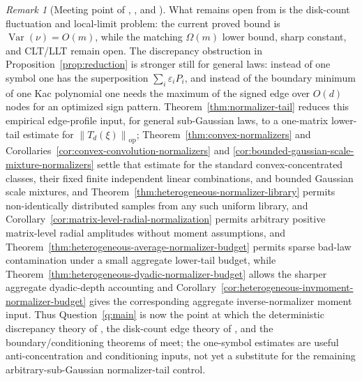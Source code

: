 \documentclass[11pt]{amsart}
\numberwithin{equation}{section}
\theoremstyle{definition}
\theoremstyle{remark}
\newtheorem{remark}[theorem]{Remark}
\newcommand{\op}{\mathrm{op}}
\newcommand{\norm}[1]{\left\lVert #1\right\rVert}
\newcommand{\eps}{\varepsilon}
\begin{document}
\begin{remark}[Meeting point of \cite{Shmalo-paper5}, \cite{Shmalo-paper12}, and \cite{Shmalo-paper16}]
What remains open from \cite{Shmalo-paper5} is the disk-count fluctuation and
local-limit problem: the current proved bound is
\(\operatorname{Var}(\nu)=O(m)\), while the matching \(\Omega(m)\) lower bound,
sharp constant, and CLT/LLT remain open.  The discrepancy obstruction in
Proposition~\ref{prop:reduction} is stronger still for general laws: instead of
one symbol one has the superposition \(\sum_i\eps_iP_i\), and instead of the
boundary minimum of one Kac polynomial one needs the maximum of the signed edge
over \(O(d)\) nodes for an optimized sign pattern.  Theorem~\ref{thm:normalizer-tail}
reduces this empirical edge-profile input, for general sub-Gaussian laws, to a
one-matrix lower-tail estimate for \(\norm{T_d(\xi)}_{\op}\);
Theorem~\ref{thm:convex-normalizers} and
Corollaries~\ref{cor:convex-convolution-normalizers} and
\ref{cor:bounded-gaussian-scale-mixture-normalizers} settle that estimate for
the standard convex-concentrated classes, their fixed finite independent linear
combinations, and bounded Gaussian scale mixtures, and
Theorem~\ref{thm:heterogeneous-normalizer-library} permits non-identically
distributed samples from any such uniform library, and
Corollary~\ref{cor:matrix-level-radial-normalization} permits arbitrary
positive matrix-level radial amplitudes without moment assumptions, and
Theorem~\ref{thm:heterogeneous-average-normalizer-budget} permits sparse
bad-law contamination under a small aggregate lower-tail budget, while
Theorem~\ref{thm:heterogeneous-dyadic-normalizer-budget} allows the sharper
aggregate dyadic-depth accounting and
Corollary~\ref{cor:heterogeneous-invmoment-normalizer-budget} gives the
corresponding aggregate inverse-normalizer moment input.  Thus
Question~\ref{q:main} is now the point at
which the deterministic discrepancy theory of \cite{Shmalo-paper12}, the
disk-count edge theory of \cite{Shmalo-paper5}, and the boundary/conditioning
theorems of \cite{Shmalo-paper16} meet; the one-symbol estimates are useful
anti-concentration and conditioning inputs, not yet a substitute for the
remaining arbitrary-sub-Gaussian normalizer-tail control.
\end{remark}
\end{document}
